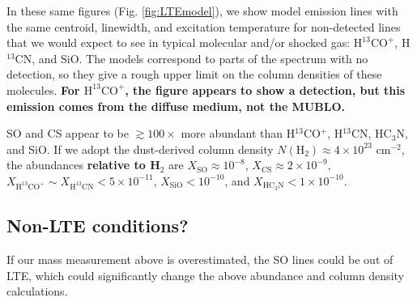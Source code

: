 \documentclass[]{aastex631}
\newcommand{\percc}{\ensuremath{\mathrm{cm}^{-3}}\xspace}
\newcommand{\persc}{\ensuremath{\mathrm{cm}^{-2}}\xspace}
\def\rr#1{\textbf{#1}}
\newcommand{\hcopthirt}{\ensuremath{\mathrm{H}^{13}\mathrm{CO}^+}\xspace}
\begin{document}
In these same figures (Fig. \ref{fig:LTEmodel}), we show model emission lines with the same centroid, linewidth, and excitation temperature for non-detected lines that we would expect to see in typical molecular and/or shocked gas: \hcopthirt, H$^{13}$CN, and SiO.
The models correspond to parts of the spectrum with no detection, so they give a rough upper limit on the column densities of these molecules.
\rr{For \hcopthirt, the figure appears to show a detection, but this emission comes from the diffuse medium, not the MUBLO.}

SO and CS appear to be $\gtrsim100\times$ more abundant than  H$^{13}$CO$^{+}$, H$^{13}$CN, HC$_3$N, and SiO.
If we adopt the dust-derived column density $N(\mathrm{H
}_2)\approx4\times10^{23}$ \persc, the abundances \rr{relative to H$_2$} are $X_\mathrm{SO}\approx10^{-8}$, $X_\mathrm{CS}\approx2\times10^{-9}$, $X_\mathrm{H^{13}CO^+} \sim X_\mathrm{H^{13}CN} < 5\times10^{-11}$, $X_\mathrm{SiO}<10^{-10}$, and $X_\mathrm{HC_3N} < 1\times10^{-10}$.



\subsection{Non-LTE conditions?}
\label{sec:nonlte}
If our mass measurement above is overestimated, the SO lines could be out of LTE, which could significantly change the above abundance and column density calculations.
\end{document}
